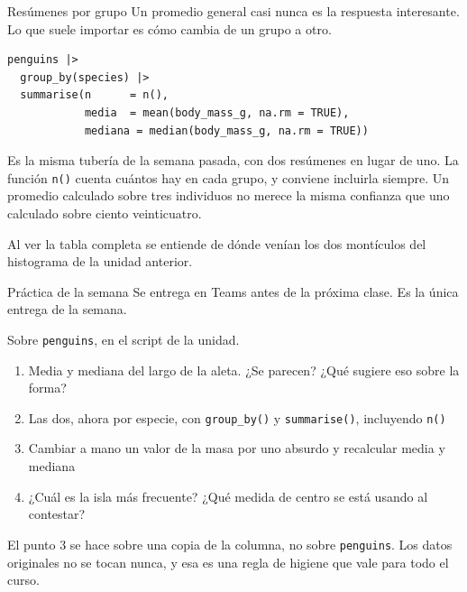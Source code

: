 \documentclass[aspectratio=169,10pt]{beamer}
\newcommand{\Rc}[1]{{\setlength{\fboxsep}{1.6pt}%
  \colorbox{codigoFondo}{\textcolor{codigoTexto}{\texttt{#1}}}}}
\newcommand{\destaca}[1]{%
  \par\vspace{3pt}\noindent
  \colorbox{azulClaro}{%
    \parbox{\dimexpr\linewidth-2\fboxsep\relax}{\vspace{3pt}#1\vspace{3pt}}}%
  \par\vspace{3pt}}
\begin{document}
\begin{frame}[fragile]{Resúmenes por grupo}
  Un promedio general casi nunca es la respuesta interesante. Lo que suele importar es
  cómo cambia de un grupo a otro.

\begin{lstlisting}
penguins |>
  group_by(species) |>
  summarise(n      = n(),
            media  = mean(body_mass_g, na.rm = TRUE),
            mediana = median(body_mass_g, na.rm = TRUE))
\end{lstlisting}

  \vspace{0.25cm}
  \destaca{\small Es la misma tubería de la semana pasada, con dos resúmenes en lugar de
  uno. La función \Rc{n()} cuenta cuántos hay en cada grupo, y conviene incluirla
  siempre. Un promedio calculado sobre tres individuos no merece la misma confianza que
  uno calculado sobre ciento veinticuatro.

  \vspace{0.15cm}
  Al ver la tabla completa se entiende de dónde venían los dos montículos del histograma
  de la unidad anterior.}
\end{frame}
\begin{frame}[fragile]{Práctica de la semana}
  {\small\color{grisT} Se entrega en Teams antes de la próxima clase. Es la única entrega de la semana.}

  \vspace{0.2cm}
  Sobre \texttt{penguins}, en el script de la unidad.

  \vspace{0.25cm}
  \begin{enumerate}
    \item Media y mediana del largo de la aleta. ¿Se parecen? ¿Qué sugiere eso sobre la forma?
    \item Las dos, ahora por especie, con \Rc{group\_by()} y \Rc{summarise()}, incluyendo \Rc{n()}
    \item Cambiar a mano un valor de la masa por uno absurdo y recalcular media y mediana
    \item ¿Cuál es la isla más frecuente? ¿Qué medida de centro se está usando al contestar?
  \end{enumerate}

  \vspace{0.3cm}
  \destaca{\small El punto 3 se hace sobre una copia de la columna, no sobre
  \texttt{penguins}. Los datos originales no se tocan nunca, y esa es una regla de
  higiene que vale para todo el curso.}
\end{frame}
\end{document}
